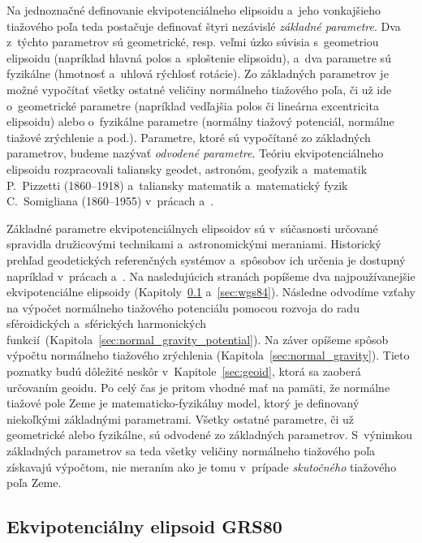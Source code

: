 \documentclass[a4paper, 12pt]{book}
\begin{document}
Na jednoznačné definovanie ekvipotenciálneho elipsoidu a~jeho vonkajšieho 
tiažového poľa teda postačuje definovať štyri nezávislé \emph{základné 
parametre}.  Dva z~týchto parametrov sú geometrické, resp. veľmi úzko súvisia 
s~geometriou elipsoidu (napríklad hlavná polos a~sploštenie elipsoidu), a~dva 
parametre sú fyzikálne (hmotnosť a~uhlová rýchlosť rotácie).  Zo základných 
parametrov je možné vypočítať všetky ostatné veličiny normálneho tiažového 
poľa, či už ide o~geometrické parametre (napríklad vedľajšia polos či lineárna 
excentricita elipsoidu) alebo o~fyzikálne parametre (normálny tiažový 
potenciál, normálne tiažové zrýchlenie a pod.).  Parametre, ktoré sú vypočítané 
zo základných parametrov, budeme nazývať \emph{odvodené parametre}.  Teóriu 
ekvipotenciálneho elipsoidu rozpracovali taliansky geodet, astronóm, geofyzik 
a~matematik P.~Pizzetti (1860--1918) a~taliansky matematik a~matematický fyzik 
C.~Somigliana (1860--1955) v~prácach \textcite{Pizzetti1984} 
a~\textcite{Somigliana1929}.

Základné parametre ekvipotenciálnych elipsoidov sú v~súčasnosti určované 
spravidla družicovými technikami a~astronomickými meraniami.  Historický 
prehľad geodetických referenčných systémov a~spôsobov ich určenia je dostupný 
napríklad v~prácach \textcite{TorgeGeodesy} a~\textcite{MoritzPhysicalGeodesy}.  
Na nasledujúcich stranách popíšeme dva najpoužívanejšie ekvipotenciálne 
elipsoidy (Kapitoly~\ref{sec:grs80} a~\ref{sec:wgs84}).  Následne odvodíme 
vzťahy na výpočet normálneho tiažového potenciálu pomocou rozvoja do radu 
sféroidických a~sférických harmonických 
funkcií~(Kapitola~\ref{sec:normal_gravity_potential}).  Na záver opíšeme spôsob 
výpočtu normálneho tiažového zrýchlenia (Kapitola~\ref{sec:normal_gravity}).  
Tieto poznatky budú dôležité neskôr v~Kapitole~\ref{sec:geoid}, ktorá sa 
zaoberá určovaním geoidu.  Po celý čas je pritom vhodné mať na pamäti, že 
normálne tiažové pole Zeme je matematicko-fyzikálny model, ktorý je definovaný 
niekoľkými základnými parametrami.  Všetky ostatné parametre, či už geometrické 
alebo fyzikálne, sú odvodené zo základných parametrov.  S~výnimkou základných 
parametrov sa teda všetky veličiny normálneho tiažového poľa získavajú 
výpočtom, nie meraním ako je tomu v~prípade \emph{skutočného} tiažového poľa 
Zeme.





\newpage
\subsection{Ekvipotenciálny elipsoid GRS80}
\label{sec:grs80}
\end{document}
